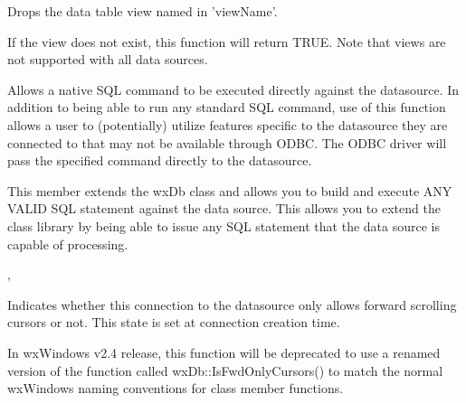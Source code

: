 \label{wxdbdropview}


Drops the data table view named in 'viewName'.




If the view does not exist, this function will return TRUE.  Note that views are not supported with all data sources.

\label{wxdbexecsql}


Allows a native SQL command to be executed directly against the datasource.  In addition to being able to run any standard SQL command, use of this function allows a user to (potentially) utilize features specific to the datasource they are connected to that may not be available through ODBC.  The ODBC driver will pass the specified command directly to the datasource.




This member extends the wxDb class and allows you to build and execute ANY VALID
SQL statement against the data source.  This allows you to extend the class 
library by being able to issue any SQL statement that the data source is capable
of processing.


, 

\label{wxdbfwdonlycursors}


Indicates whether this connection to the datasource only allows forward scrolling cursors or not.  This state is set at connection creation time.


In wxWindows v2.4 release, this function will be deprecated to use a renamed version of the function called wxDb::IsFwdOnlyCursors() to match the normal wxWindows naming conventions for class member functions.

